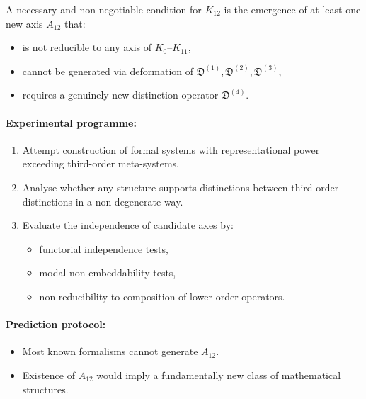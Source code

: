 A necessary and non-negotiable condition for $K_{12}$ is the emergence 
of at least one new axis $A_{12}$ that:

\begin{itemize}
    \item is not reducible to any axis of $K_{0}$–$K_{11}$,
    \item cannot be generated via deformation of  
          $\mathfrak{D}^{(1)}, \mathfrak{D}^{(2)}, \mathfrak{D}^{(3)}$,
    \item requires a genuinely new distinction operator 
          $\mathfrak{D}^{(4)}$.
\end{itemize}

\paragraph{Experimental programme:}

\begin{enumerate}
    \item Attempt construction of formal systems with representational 
          power exceeding third-order meta-systems.
    \item Analyse whether any structure supports distinctions 
          between third-order distinctions in a non-degenerate way.
    \item Evaluate the independence of candidate axes by:
          \begin{itemize}
              \item functorial independence tests,
              \item modal non-embeddability tests,
              \item non-reducibility to composition of lower-order operators.
          \end{itemize}
\end{enumerate}

\paragraph{Prediction protocol:}

\begin{itemize}
    \item Most known formalisms cannot generate $A_{12}$.
    \item Existence of $A_{12}$ would imply a fundamentally new class 
          of mathematical structures.
\end{itemize}



